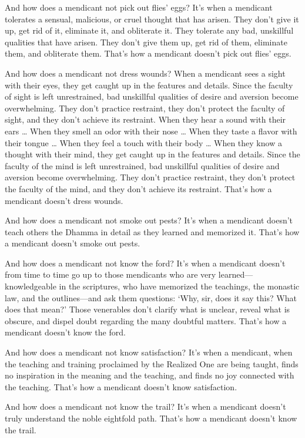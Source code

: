 \documentclass[12pt,openany]{book}%
\begin{document}
And how does a mendicant not pick out flies’ eggs? It’s when a mendicant tolerates a sensual, malicious, or cruel thought that has arisen. They don’t give it up, get rid of it, eliminate it, and obliterate it. They tolerate any bad, unskillful qualities that have arisen. They don’t give them up, get rid of them, eliminate them, and obliterate them. That’s how a mendicant doesn’t pick out flies’ eggs. 

And how does a mendicant not dress wounds? When a mendicant sees a sight with their eyes, they get caught up in the features and details. Since the faculty of sight is left unrestrained, bad unskillful qualities of desire and aversion become overwhelming. They don’t practice restraint, they don’t protect the faculty of sight, and they don’t achieve its restraint. When they hear a sound with their ears … When they smell an odor with their nose … When they taste a flavor with their tongue … When they feel a touch with their body … When they know a thought with their mind, they get caught up in the features and details. Since the faculty of the mind is left unrestrained, bad unskillful qualities of desire and aversion become overwhelming. They don’t practice restraint, they don’t protect the faculty of the mind, and they don’t achieve its restraint. That’s how a mendicant doesn’t dress wounds. 

And how does a mendicant not smoke out pests? It’s when a mendicant doesn’t teach others the Dhamma in detail as they learned and memorized it. That’s how a mendicant doesn’t smoke out pests. 

And how does a mendicant not know the ford? It’s when a mendicant doesn’t from time to time go up to those mendicants who are very learned—knowledgeable in the scriptures, who have memorized the teachings, the monastic law, and the outlines—and ask them questions: ‘Why, sir, does it say this? What does that mean?’ Those venerables don’t clarify what is unclear, reveal what is obscure, and dispel doubt regarding the many doubtful matters. That’s how a mendicant doesn’t know the ford. 

And how does a mendicant not know satisfaction? It’s when a mendicant, when the teaching and training proclaimed by the Realized One are being taught, finds no inspiration in the meaning and the teaching, and finds no joy connected with the teaching. That’s how a mendicant doesn’t know satisfaction. 

And how does a mendicant not know the trail? It’s when a mendicant doesn’t truly understand the noble eightfold path. That’s how a mendicant doesn’t know the trail. 
\end{document}
